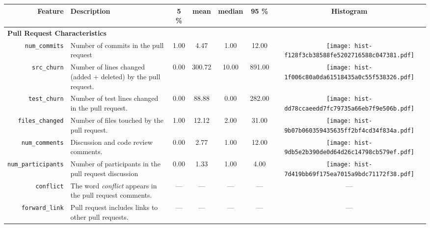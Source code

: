 \begin{table*}[ht]
\centering
\begin{small}
\begin{tabular}{rp{22em}ccccc}
  \hline
  \bfseries{Feature} & \bfseries{Description} & \bfseries{5 \%} & \bfseries{mean} & \bfseries{median} & \bfseries{95 \%} & \bfseries{Histogram} \\ 
  \hline

  \multicolumn{2}{l}{\bf{Pull Request Characteristics}}\\

  \texttt{num\_commits} & Number of commits in the pull request & 1.00 & 4.47 & 1.00 & 12.00 & \texttt{[image: hist-f128f3cb38588fe5202716588c047381.pdf]} \\ 
  \texttt{src\_churn} & Number of lines changed (added + deleted) by the pull request. & 0.00 & 300.72 & 10.00 & 891.00 & \texttt{[image: hist-1f006c80a0da61518435a0c55f538326.pdf]} \\ 
  \texttt{test\_churn} & Number of test lines changed in the pull request. & 0.00 & 88.88 & 0.00 & 282.00 & \texttt{[image: hist-dd78ccaeedd7fc79735a66eb7f9e506b.pdf]} \\ 
  \texttt{files\_changed} & Number of files touched by the pull request. & 1.00 & 12.12 & 2.00 & 31.00 & \texttt{[image: hist-9b07b060359435635ff2bf4cd34f834a.pdf]} \\ 
  \texttt{num\_comments} & Discussion and code review comments. & 0.00 & 2.77 & 1.00 & 12.00 & \texttt{[image: hist-9db5e2b390de0d64d26c14798cb579ef.pdf]} \\ 
 
  \texttt{num\_participants} & Number of participants in the pull request discussion & 0.00 & 1.33 & 1.00 & 4.00 & \texttt{[image: hist-7d419bb69f175ea7015a9bdc71172f38.pdf]} \\

  \texttt{conflict} & The word \emph{conflict} appears in the pull request comments.  & --- & --- & --- & --- & ---\\

    \texttt{forward\_link} & Pull request includes links to other
    pull requests. & --- & --- & --- & --- & --- \\



\end{tabular}
\end{small}
\end{table*}
